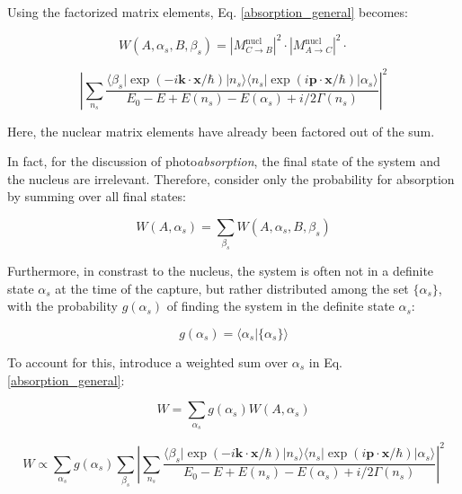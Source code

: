 \documentclass{article}
\begin{document}
Using the factorized matrix elements, Eq. \ref{absorption_general} becomes:

\begin{equation}
\label{absorption_general_factorized}
	W (A, \alpha_s, B, \beta_s)= \left| M^{\mathrm{nucl}}_{C \to B} \right|^2 \cdot \left| M^{\mathrm{nucl}}_{A \to C} \right|^2 \cdot 
\end{equation}

\begin{equation*}
\left| \sum_{n_s} \frac{ \langle \beta_s | \exp{\left( - i \mathbf{k} \cdot \mathbf{x} / \hbar \right)} | n_s \rangle \langle n_s | \exp{\left( i \mathbf{p} \cdot \mathbf{x} / \hbar \right)} | \alpha_s \rangle  }{E_0 - E + E(n_s) - E(\alpha_s) + i/2 \Gamma(n_s)} \right| ^2
\end{equation*}

Here, the nuclear matrix elements have already been factored out of the sum.

In fact, for the discussion of photo\textit{absorption}, the final state of the system and the nucleus are irrelevant. Therefore, consider only the probability for absorption by summing over all final states:

\begin{equation}
\label{absorption_general_no_final}
W(A, \alpha_s) = \sum_{\beta_s} W(A, \alpha_s, B, \beta_s)
\end{equation}


Furthermore, in constrast to the nucleus, the system is often not in a definite state $\alpha_s$ at the time of the capture, but rather distributed among the set $\{ \alpha_s \}$, with the probability $g(\alpha_s)$ of finding the system in the definite state $\alpha_s$:

\begin{equation}
	\label{g_alpha}
	g(\alpha_s) = \langle \alpha_s | \{ \alpha_s \} \rangle
\end{equation}

To account for this, introduce a weighted sum over $\alpha_s$ in Eq. \ref{absorption_general}:

\begin{equation}
\label{absorption_general_alpha_s_distribution}
W = \sum_{\alpha_s} g(\alpha_s) W(A, \alpha_s)
\end{equation}

\begin{equation}
\label{absorption_simplification_1}
	W \propto \sum_{\alpha_s} g(\alpha_s) \sum_{\beta_s} \left| \sum_{n_s} \frac{ \langle \beta_s | \exp{\left( - i \mathbf{k} \cdot \mathbf{x} / \hbar \right)} | n_s \rangle \langle n_s | \exp{\left( i \mathbf{p} \cdot \mathbf{x} / \hbar \right)} | \alpha_s \rangle  }{E_0 - E + E(n_s) - E(\alpha_s) + i/2 \Gamma(n_s)} \right| ^2
\end{equation}
\end{document}
